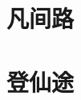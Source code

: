\documentclass[b5paper,12pt,twoside,openright]{memoir}
\title{\ctitle}
\author{西南往南}
\date{}
\begin{document}
\frontmatter


\thispagestyle{empty}           %
\cleardoublepage

\setcounter{page}{1}

\cleardoublepage

\renewcommand\cftchapterpagefont{\normalfont} %
\renewcommand\cftchapterfont{\normalfont} %
\renewcommand\cftbeforechapterskip{2pt plus 1pt} %
\tableofcontents*

\mainmatter

\part{凡间路}

\part{登仙途}
\pagestyle{mystyle}

% 
% 
% 
% 
% 
% 
% 
% 


\appendix
\backmatter
\end{document}
